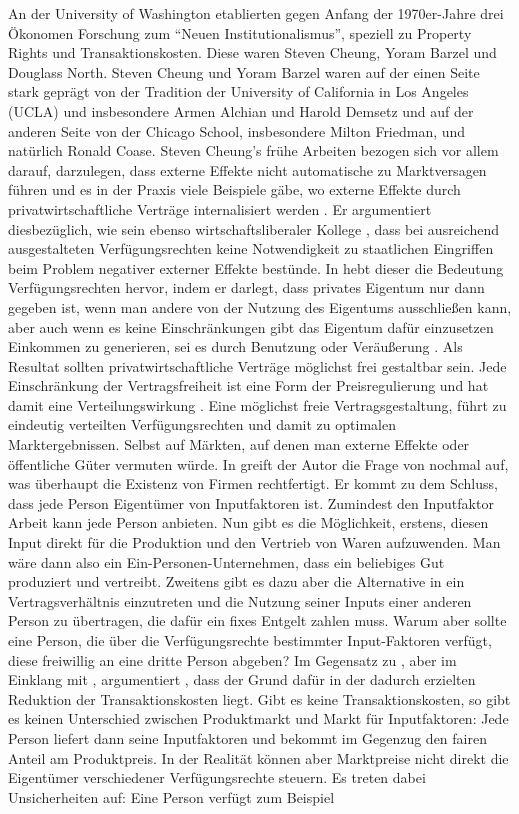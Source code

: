 An der University of Washington etablierten gegen Anfang der 1970er-Jahre drei Ökonomen Forschung zum "`Neuen Institutionalismus"', speziell zu Property Rights und Transaktionskosten. Diese waren Steven Cheung, Yoram Barzel und Douglass North. Steven Cheung und Yoram Barzel waren auf der einen Seite stark geprägt von der Tradition der University of California in Los Angeles (UCLA) und insbesondere Armen Alchian und Harold Demsetz und auf der anderen Seite von der Chicago School, insbesondere Milton Friedman, und natürlich Ronald Coase. Steven Cheung's frühe Arbeiten bezogen sich vor allem darauf, darzulegen, dass externe Effekte nicht automatische zu Marktversagen führen und es in der Praxis viele Beispiele gäbe, wo externe Effekte durch privatwirtschaftliche Verträge internalisiert werden \parencite{Cheung1973}. Er argumentiert diesbezüglich, wie sein ebenso wirtschaftsliberaler Kollege \textcite{Demsetz2011}, dass bei ausreichend ausgestalteten Verfügungsrechten keine Notwendigkeit zu staatlichen Eingriffen beim Problem negativer externer Effekte bestünde. In \textcite{Cheung1974} hebt dieser die Bedeutung Verfügungsrechten hervor, indem er darlegt, dass privates Eigentum nur dann gegeben ist, wenn man andere von der Nutzung des Eigentums ausschließen kann, aber auch wenn es keine Einschränkungen gibt das Eigentum dafür einzusetzen Einkommen zu generieren, sei es durch Benutzung oder Veräußerung \parencite[S. 56f]{Cheung1974}. Als Resultat sollten privatwirtschaftliche Verträge möglichst frei gestaltbar sein. Jede Einschränkung der Vertragsfreiheit ist eine Form der Preisregulierung und hat damit eine Verteilungswirkung \parencite[S. 66]{Cheung1974}. Eine möglichst freie Vertragsgestaltung, führt zu eindeutig verteilten Verfügungsrechten und damit zu optimalen Marktergebnissen. Selbst auf Märkten, auf denen man externe Effekte oder öffentliche Güter vermuten würde. In \textcite{Cheung1983} greift der Autor die Frage von \textcite{Coase1937} nochmal auf, was überhaupt die Existenz von Firmen rechtfertigt. Er kommt zu dem Schluss, dass jede Person Eigentümer von Inputfaktoren ist. Zumindest den Inputfaktor Arbeit kann jede Person anbieten. Nun gibt es die Möglichkeit, erstens, diesen Input direkt für die Produktion und den Vertrieb von Waren aufzuwenden. Man wäre dann also ein Ein-Personen-Unternehmen, dass ein beliebiges Gut produziert und vertreibt. Zweitens gibt es dazu aber die Alternative in ein Vertragsverhältnis einzutreten und die Nutzung seiner Inputs einer anderen Person zu übertragen, die dafür ein fixes Entgelt zahlen muss. Warum aber sollte eine Person, die über die Verfügungsrechte bestimmter Input-Faktoren verfügt, diese freiwillig an eine dritte Person abgeben? Im Gegensatz zu \textcite{Alchian1972}, aber im Einklang mit \textcite{Coase1937}, argumentiert \textcite[S. 3f]{Cheung1983}, dass der Grund dafür in der dadurch erzielten Reduktion der Transaktionskosten liegt. Gibt es keine Transaktionskosten, so gibt es keinen Unterschied zwischen Produktmarkt und Markt für Inputfaktoren: Jede Person liefert dann seine Inputfaktoren und bekommt im Gegenzug den fairen Anteil am Produktpreis. In der Realität können aber Marktpreise nicht direkt die Eigentümer verschiedener Verfügungsrechte steuern. Es treten dabei Unsicherheiten auf: Eine Person verfügt zum Beispiel 